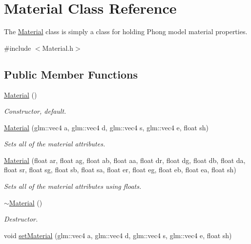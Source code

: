 \hypertarget{class_material}{}\section{Material Class Reference}
\label{class_material}


The \hyperlink{class_material}{Material} class is simply a class for holding Phong model material properties.  




{\ttfamily \#include $<$Material.\+h$>$}

\subsection*{Public Member Functions}
\begin{DoxyCompactItemize}
\item 
\mbox{\label{class_material_a137e987401b63eb7c6c27c3e38bc74b5}} 
\hyperlink{class_material_a137e987401b63eb7c6c27c3e38bc74b5}{Material} ()
\begin{DoxyCompactList}\small\item\em Constructor, default. \end{DoxyCompactList}\item 
\hyperlink{class_material_aa08d070b8078bc0e4c8074335005c527}{Material} (glm\+::vec4 a, glm\+::vec4 d, glm\+::vec4 s, glm\+::vec4 e, float sh)
\begin{DoxyCompactList}\small\item\em Sets all of the material attributes. \end{DoxyCompactList}\item 
\hyperlink{class_material_a310fdb9e639b7cd494b9b7c818bebd5b}{Material} (float ar, float ag, float ab, float aa, float dr, float dg, float db, float da, float sr, float sg, float sb, float sa, float er, float eg, float eb, float ea, float sh)
\begin{DoxyCompactList}\small\item\em Sets all of the material attributes using floats. \end{DoxyCompactList}\item 
\hyperlink{class_material_a2c19452d71f54075df8f5405b03129f4}{$\sim$\+Material} ()
\begin{DoxyCompactList}\small\item\em Destructor. \end{DoxyCompactList}\item 
void \hyperlink{class_material_aab8e68d084dd7ec2ab9da966ec56233e}{set\+Material} (glm\+::vec4 a, glm\+::vec4 d, glm\+::vec4 s, glm\+::vec4 e, float sh)

\end{DoxyCompactItemize}
